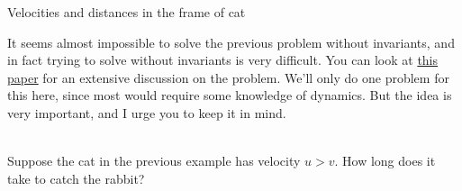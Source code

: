     \begin{marginfigure}
        \vspace{-18em}
        \caption{Velocities and distances in the frame of cat}
        \label{fig: fox-chase}
    \end{marginfigure}
        
It seems almost impossible to solve the previous problem without invariants, and in fact trying to solve without invariants 
is very difficult. You can look at \href{https://arxiv.org/pdf/1108.2006}{this paper} for an extensive discussion on 
the problem. We'll only do one problem for this here, since most would require some knowledge of dynamics. But the 
idea is very important, and I urge you to keep it in mind. 
\begin{exc}
    \begin{exercise}[subtitle={Chasing Problem}, points = 2]
        \smallskip
        ~\\
        Suppose the cat in the previous example has velocity $u > v$. How long does it take to catch the rabbit?
    \end{exercise}
    \end{exc}